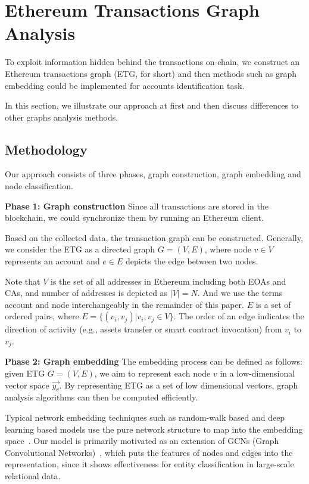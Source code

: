
\section{Ethereum Transactions Graph Analysis}
To exploit information hidden behind the transactions on-chain, we construct an Ethereum transactions graph (ETG, for short) and then methods such as graph embedding could be implemented for accounts identification task.

In this section, we illustrate our approach at first and then discuss differences to other graphs analysis methods.

\subsection{Methodology}
\label{subsec:methodology}
Our approach consists of three phases, graph construction, graph embedding and node classification. 

\textbf{Phase 1: Graph construction}
Since all transactions are stored in the blockchain, we could synchronize them by running an Ethereum client.

 Based on the collected data, the transaction graph can be constructed. Generally, we consider the ETG as a directed graph $G=(V,E)$, where node $v \in V$ represents an account and $e \in E$ depicts the edge between two nodes. 

Note that $V$ is the set of all addresses in Ethereum including both EOAs and CAs, and number of addresses is depicted as $|V|=N$. And we use the terms account and node interchangeably in the remainder of this paper. $E$ is a set of ordered pairs, where $E=\{(v_i,v_j)|v_i,v_j \in V\}$. The order of an edge indicates the direction of activity (e.g., assets transfer or smart contract invocation) from $v_i$ to $v_j$. %



\textbf{Phase 2: Graph embedding}
The embedding process can be defined as follows: given ETG $G=(V,E)$, we aim to represent each node $v$ in a low-dimensional vector space $\vec{y_v}$. By representing ETG as a set of low dimensional vectors, graph analysis algorithms can then be computed efficiently. 

Typical network embedding techniques such as random-walk based and deep learning based models use the pure network structure to map into the embedding space~\cite{goyal2018capturing}. Our model is primarily motivated as an extension of GCNs (Graph Convolutional Networks)~\cite{kipf2016semi,schlichtkrull2018modeling}, which puts the features of nodes and edges into the representation, since it shows effectiveness for entity classification in large-scale relational data.

